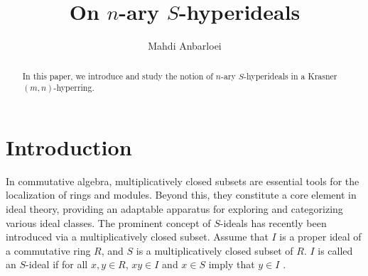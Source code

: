 \documentclass[preprint,review,10pt]{amsart}
\theoremstyle{definition}
\theoremstyle{remark}
\numberwithin{equation}{section}
\begin{document}
\title{ On  $n$-ary $S$-hyperideals }

\author{Mahdi Anbarloei}
\address{Department of Mathematics, Faculty of Sciences,
Imam Khomeini International University, Qazvin, Iran.
}






 

\begin{abstract}
 In this paper, we introduce and study the notion of  $n$-ary $S$-hyperideals in a Krasner $(m,n)$-hyperring. 

\end{abstract}
\maketitle

\section{Introduction} 
In commutative algebra, multiplicatively closed subsets are essential tools for the localization of rings and modules. Beyond this, they constitute a core element in    ideal theory, providing an adaptable apparatus for exploring and categorizing various ideal classes. The prominent concept of $S$-ideals has     recently been introduced via a multiplicatively closed subset.   Assume that $I$ is a proper ideal of a commutative ring $R$, and   $S$  is a multiplicatively closed subset of $R$.   $I$ is called  an $S$-ideal if for all $x, y \in R$,   $xy \in I$ and $x \in S$ imply that $y \in I$  \cite{Khashan}.
\end{document}
